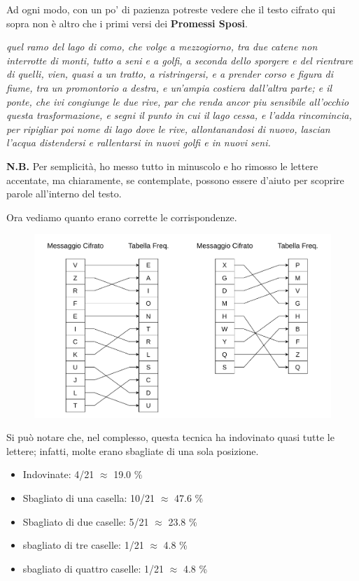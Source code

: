 \documentclass{report}
\begin{document}
\newpage
Ad ogni modo, con un po' di pazienza potreste vedere che il testo cifrato qui sopra non è altro che i primi versi dei \textbf{Promessi Sposi}.

\vspace{0.2cm}
\textit{quel ramo del lago di como, che volge a mezzogiorno, tra due catene non interrotte di monti, tutto a seni e a golfi, a seconda dello sporgere e del rientrare di quelli, vien, quasi a un tratto, a ristringersi, e a prender corso e figura di fiume, tra un promontorio a destra, e un’ampia costiera dall’altra parte; e il ponte, che ivi congiunge le due rive, par che renda ancor piu sensibile all’occhio questa trasformazione, e segni il punto in cui il lago cessa, e l’adda rincomincia, per ripigliar poi nome di lago dove le rive, allontanandosi di nuovo, lascian l’acqua distendersi e rallentarsi in nuovi golfi e in nuovi seni. }
\vspace{0.2cm}


\textbf{N.B.} Per semplicità, ho messo tutto in minuscolo e ho rimosso le lettere accentate, ma chiaramente, se contemplate, possono essere d'aiuto per scoprire parole all'interno del testo.

\vspace{0.2cm}

Ora vediamo quanto erano corrette le corrispondenze.


\begin{figure}[h]

    \centering
    \includegraphics[width=\linewidth]{logos/1_5_cripto.pdf}

\end{figure}

Si può notare che, nel complesso, questa tecnica ha indovinato quasi tutte le lettere; infatti, molte erano sbagliate di una sola posizione.

\begin{itemize}
    \item Indovinate: 4/21 $\approx$ 19.0 \%
    \item Sbagliato di una casella: 10/21 $\approx$ 47.6 \%
    \item Sbagliato di due caselle: 5/21 $\approx$ 23.8 \%
    \item sbagliato di tre caselle: 1/21 $\approx$ 4.8 \%
    \item sbagliato di quattro caselle: 1/21 $\approx$ 4.8 \%
\end{itemize}
\end{document}
